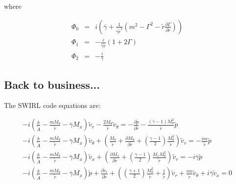 where

\begin{eqnarray}
\Phi_0 
&=&
i 
\left(
\overline{\gamma} 
+\frac{1 }{\overline{\gamma} \widetilde{r}^2}
\left(
m^2
- \Gamma^2
-\widetilde{r}
\frac{\partial \Gamma}{\partial \widetilde{r}}
\right)
\right)
\nonumber
\\
\Phi_1 
&=&
-\frac{i}{\overline{\gamma} \widetilde{r}}
\left(
1
+
2 \Gamma
\right)
\nonumber
\\
\Phi_2 
&=&
-\frac{i}{ \overline{\gamma}}
\nonumber
\end{eqnarray}

\subsection{Back to business...}

The SWIRL code equations are:

\begin{small}
\begin{eqnarray}
-i
\left(
 \frac{k}{ \widetilde{A}}
- \frac{ m M_{\theta} }{\widetilde{r}}
- \overline{\gamma} M_x  
\right) \widetilde{v}_r 
-\frac{2 M_{\theta}}{\widetilde{r}} \widetilde{v}_{\theta} 
 = 
-
\frac{\partial \widetilde{p} }{\partial \widetilde{r}} 
-
\frac{\left(\gamma - 1 \right) M_{\theta}^2}{\widetilde{r}} \widetilde{p}
\nonumber
\\
-i
\left(
\frac{k}{\widetilde{A}}
- \frac{ m M_{\theta} }{\widetilde{r} }
- \overline{\gamma} M_x  
\right) \widetilde{v}_{\theta} 
+
\left(
\frac{M_{\theta} }{\widetilde{r}}
+
\frac{\partial M_{\theta} }{\partial \widetilde{r}}
+
\left(\frac{\gamma - 1}{2} \right) \frac{M_{\theta}^3}{\widetilde{r}}
\right) 
\widetilde{v}_r
 = 
-\frac{i m }{\widetilde{r} } \widetilde{p}
\nonumber
\\
-i
\left(
\frac{k}{\widetilde{A}}
- \frac{ m M_{\theta} }{\widetilde{r} }
- \overline{\gamma} M_x
\right) \widetilde{v}_x 
+
\left(
\frac{\partial M_x }{\partial \widetilde{r}} 
+
\left(\frac{\gamma - 1}{2} \right) \frac{M_x M_{\theta}^2}{\widetilde{r}}
\right)
\widetilde{v}_r
 = 
-i \overline{\gamma} \widetilde{p}
\nonumber
\\
-i
\left(
\frac{k}{\widetilde{A}}
- \frac{ m M_{\theta}}{\widetilde{r} } 
-  \overline{\gamma} M_x
\right) \widetilde{p}
+ 
\frac{\partial \widetilde{v}_r }{\partial \widetilde{r}}
+ 
\left(
\left(\frac{\gamma + 1}{2} \right) \frac{M_{\theta}^2}{\widetilde{r}}
+\frac{1 }{\widetilde{r}} 
\right)
\widetilde{v}_r
+\frac{i m }{\widetilde{r}} \widetilde{v}_{\theta} 
+ i \overline{\gamma} \widetilde{v}_x 
 = 
0
\nonumber
\end{eqnarray}
\end{small}%

